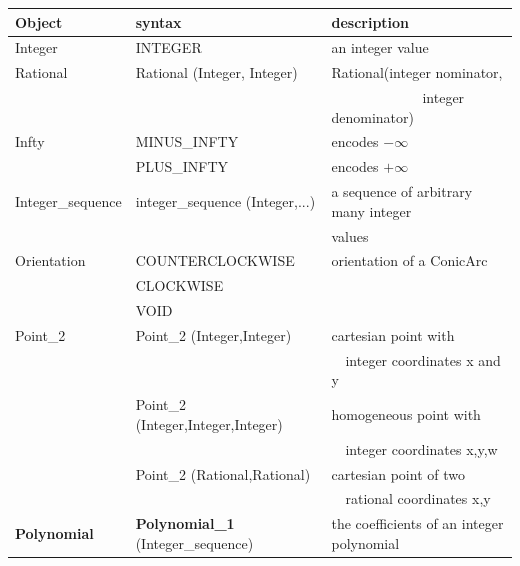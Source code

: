 \begin{tabular}{*{3}{| l} |} \hline
Object   & syntax                         & description \\ \hline \hline
Integer  & INTEGER                        & an integer value \\ \hline
Rational & Rational (Integer, Integer)    & Rational(integer nominator, \\
         &                                & \ \ \ \ \ \ \ \ \ \ \ \ \ integer denominator)
                                            \\ \hline
Infty    & MINUS\_INFTY                   & encodes $-\infty$ \\ 
         & PLUS\_INFTY                    & encodes $+\infty$  \\ \hline

Integer\_sequence & integer\_sequence (Integer,...)      
                        & a sequence of arbitrary many integer  \\ 
                  &     &  values \\ \hline
Orientation & COUNTERCLOCKWISE            & orientation of a ConicArc  \\
            & CLOCKWISE                   &           \\
            & VOID                        &           \\ \hline

Point\_2 & Point\_2 (Integer,Integer)     & cartesian point with \\
         &                                & \ \ integer coordinates x and y \\
         & Point\_2 (Integer,Integer,Integer) & homogeneous point with \\ 
         &                                & \ \ integer coordinates x,y,w\\
         & Point\_2 (Rational,Rational)   & cartesian point of two \\
         &                                & \ \ rational coordinates x,y\\ \hline
{\bf Polynomial}    & {\bf Polynomial\_1} (Integer\_sequence) 
                             & the coefficients of an integer polynomial \\ \hline


\end{tabular}
